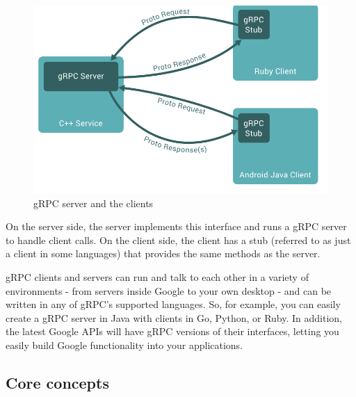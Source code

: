 	\begin{figure}[h!]
		\begin{center}
			\includegraphics[scale=0.8]{include/imgs/grpc_works.PNG}	
		\end{center}
		\caption{gRPC server and the clients \cite{grpcspec}}
	\end{figure}

	On the server side, the server implements this interface and runs a gRPC server to handle client calls. On the client side, the
	client has a stub (referred to as just a client in some languages) that provides the same methods as the server.

	gRPC clients and servers can run and talk to each other in a variety of environments - from servers inside Google to your own desktop - 
	and can be written in any of gRPC’s supported languages. So, for example, you can easily create a gRPC server in Java with clients 
	in Go, Python, or Ruby. In addition, the latest Google APIs will have gRPC versions of their interfaces, letting you easily build Google functionality 
	into your applications.

	\subsection{Core concepts}

